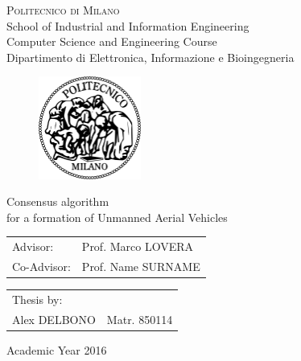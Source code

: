 \begin{titlepage}

\begin{center}
\Large{\textsc{Politecnico di Milano}}\\
\Large{School of Industrial and Information Engineering}\\
\large{Computer Science and Engineering Course}\\
\large{Dipartimento di Elettronica, Informazione e Bioingegneria}
\par
\end{center}

\vspace{0.2cm}

\begin{center}
\begin{figure}[h]
\centering{}
\includegraphics[width=0.3\textwidth]{title-page/logo-polimi}
\end{figure}
\par
\end{center}

\begin{center}
\LARGE{Consensus algorithm \\for a formation of Unmanned Aerial Vehicles}
\vspace{1.0cm}
\par
\end{center}

\begin{flushleft}
\begin{tabular}{ll}
Advisor:  & Prof. Marco LOVERA\tabularnewline
Co-Advisor:  & Prof. Name SURNAME\tabularnewline
\end{tabular}\vspace{0.5cm}
\par
\end{flushleft}

\begin{flushright}
\begin{tabular}{ll}
Thesis by: & \tabularnewline
Alex DELBONO & Matr. 850114\tabularnewline
\end{tabular}\vspace{1cm}
\par
\end{flushright}

\begin{center}
{\large{}Academic Year 2016}
\par
\end{center}{\large \par}

\end{titlepage}
